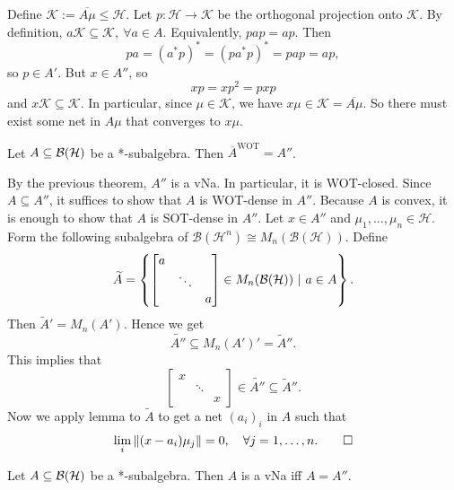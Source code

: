 \begin{myproof}
  Define $\mathcal{K} := \overline{A \mu} \leq \mathcal{H}$. Let $p: \mathcal{H} \to \mathcal{K}$ be the orthogonal projection onto $\mathcal{K}$.
  By definition, $a \mathcal{K} \subseteq \mathcal{K},\ \forall a \in A$.
  Equivalently, $pap = ap$. Then 
  $$pa = (a^* p) ^* = (p a^* p)^* = pap = ap,$$
  so $p \in A'$. But $x \in A''$, so  
  $$xp = xp^2 = pxp$$
  and $x \mathcal{K} \subseteq \mathcal{K}$. In particular, since $\mu \in \mathcal{K}$, we have $x \mu \in \mathcal{K} = \overline{A\mu}$.
  So there must exist some net in $A \mu$ that converges to $x \mu$.
\end{myproof}

\begin{theorem}
  Let $A \subseteq \operatorname{\mathcal{B} (\mathcal{H})}$ be a *-subalgebra. Then $\overline{A}^{\mathrm{WOT}} = A''$.
\end{theorem}

\begin{myproof}
  By the previous theorem, $A''$ is a vNa. In particular, it is WOT-closed.
  Since $A \subseteq A''$, it suffices to show that $A$ is WOT-dense in $A''$.
  Because $A$ is convex, it is enough  to show that $A$ is SOT-dense in $A''$.
  Let $x \in A''$ and $\mu_1,\dots, \mu_n \in \mathcal{H}$. Form the following subalgebra of $\mathcal{B} (\mathcal{H}^n) \cong M_n (\mathcal{B}(\mathcal{H})).$
  Define 
  $$\widetilde{A} = \left\lbrace \begin{bmatrix}
    a & &\\
    & \ddots &\\
    & & a
  \end{bmatrix} \in M_n (\operatorname{\mathcal{B} (\mathcal{H})})\ |\ a \in A\right\rbrace.$$
  Then $\widetilde{A}' = M_n (A')$.
  Hence we get 
  $$\widetilde{A''} \subseteq M_n (A') ' = \widetilde{A}''.$$
  This implies that $$\begin{bmatrix}
    x & &\\
    & \ddots &\\
    & & x
  \end{bmatrix} \in \widetilde{A''} \subseteq \widetilde{A}''.$$
  Now we apply lemma to $\widetilde{A}$ to get a net $(a_i)_i$ in $A$
  such that 
  \begin{equation*}
    \lim_{i} \| (x - a_i) \mu_j \| = 0,\quad \forall j = 1, \dots, n. \qedhere
  \end{equation*}
\end{myproof}

\begin{corollary}
  Let $A \subseteq \operatorname{\mathcal{B} (\mathcal{H})}$ be a *-subalgebra. Then $A$ is a vNa iff $A = A''$.
\end{corollary}


